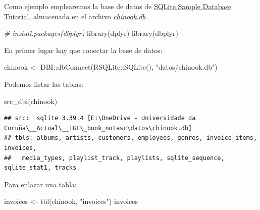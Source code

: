 \documentclass[
]{book}
\newenvironment{Shaded}{\begin{snugshade}}{\end{snugshade}}
\newcommand{\CommentTok}[1]{\textcolor[rgb]{0.56,0.35,0.01}{\textit{#1}}}
\newcommand{\FunctionTok}[1]{\textcolor[rgb]{0.00,0.00,0.00}{#1}}
\newcommand{\NormalTok}[1]{#1}
\newcommand{\OtherTok}[1]{\textcolor[rgb]{0.56,0.35,0.01}{#1}}
\newcommand{\SpecialCharTok}[1]{\textcolor[rgb]{0.00,0.00,0.00}{#1}}
\newcommand{\StringTok}[1]{\textcolor[rgb]{0.31,0.60,0.02}{#1}}
\theoremstyle{break}
\theoremstyle{nonumberplain}
\begin{document}
Como ejemplo emplearemos la base de datos de \href{https://www.sqlitetutorial.net/sqlite-sample-database/}{SQLite Sample Database Tutorial}, almacenada en el archivo \href{datos/chinook.db}{\emph{chinook.db}}.

\begin{Shaded}
\begin{Highlighting}[]
\CommentTok{\# install.packages(\textquotesingle{}dbplyr\textquotesingle{})}
\FunctionTok{library}\NormalTok{(dplyr)}
\FunctionTok{library}\NormalTok{(dbplyr)}
\end{Highlighting}
\end{Shaded}

En primer lugar hay que conectar la base de datos:

\begin{Shaded}
\begin{Highlighting}[]
\NormalTok{chinook }\OtherTok{\textless{}{-}}\NormalTok{ DBI}\SpecialCharTok{::}\FunctionTok{dbConnect}\NormalTok{(RSQLite}\SpecialCharTok{::}\FunctionTok{SQLite}\NormalTok{(), }\StringTok{"datos/chinook.db"}\NormalTok{)}
\end{Highlighting}
\end{Shaded}

Podemos listar las tablas:

\begin{Shaded}
\begin{Highlighting}[]
\FunctionTok{src\_dbi}\NormalTok{(chinook)}
\end{Highlighting}
\end{Shaded}

\begin{verbatim}
## src:  sqlite 3.39.4 [E:\OneDrive - Universidade da Coruña\__Actual\__IGE\_book_notasr\datos\chinook.db]
## tbls: albums, artists, customers, employees, genres, invoice_items, invoices,
##   media_types, playlist_track, playlists, sqlite_sequence, sqlite_stat1, tracks
\end{verbatim}

Para enlazar una tabla:

\begin{Shaded}
\begin{Highlighting}[]
\NormalTok{invoices }\OtherTok{\textless{}{-}} \FunctionTok{tbl}\NormalTok{(chinook, }\StringTok{"invoices"}\NormalTok{)}
\NormalTok{invoices}
\end{Highlighting}
\end{Shaded}
\end{document}
